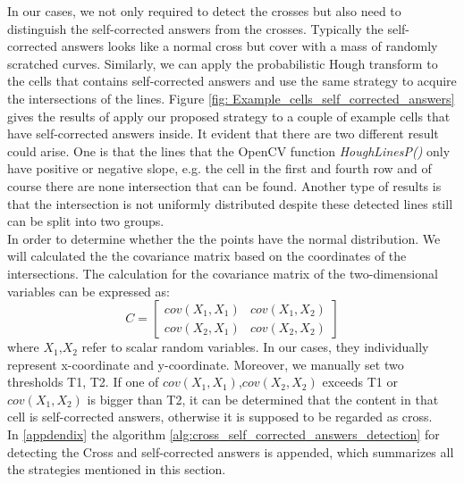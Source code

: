 \documentclass[a4paper,twoside]{article}
\begin{document}
In our cases, we not only required to detect the crosses but also need to distinguish the self-corrected answers from the crosses. Typically the self-corrected answers looks like a normal cross but cover with a mass of randomly scratched curves. Similarly, we can apply the probabilistic Hough transform to the cells that contains self-corrected answers and use the same strategy to acquire the intersections of the lines. Figure \ref{fig: Example_cells_self_corrected_answers} gives the results of apply our proposed strategy to a couple of example cells that have self-corrected answers inside. It evident that there are two different result could arise. One is that the lines that the OpenCV function \textit{HoughLinesP()} only have positive or negative slope, e.g. the cell in the first and fourth row and of course there are none intersection that can be found. Another type of results is that the intersection is not uniformly distributed despite these detected lines still can be split into two groups.\\
In order to determine whether the the points have the normal distribution. We will calculated the the covariance matrix based on the coordinates of the intersections. The calculation for the covariance matrix of the two-dimensional variables can be expressed as:
\begin{equation*}
    C = 
    \begin{bmatrix}
    cov(X_1,X_1)&cov(X_1,X_2)\\
    cov(X_2,X_1)&cov(X_2,X_2)
    \end{bmatrix}
\end{equation*}
where $X_1$,$X_2$ refer to scalar random variables. In our cases, they individually represent x-coordinate and y-coordinate. Moreover, we manually set two thresholds T1, T2. If one of $cov(X_1,X_1)$,$cov(X_2,X_2)$ exceeds T1 or $cov(X_1,X_2)$ is bigger than T2, it can be determined that the content in that cell is self-corrected answers, otherwise it is supposed to be regarded as cross.\\
In \ref{appdendix} the algorithm \ref{alg:cross_self_corrected_answers_detection} for detecting the Cross and self-corrected answers is appended, which summarizes all the strategies mentioned in this section.
\end{document}
